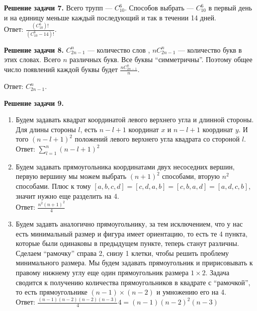 \documentclass[a4paper,12pt]{article}
\newenvironment{problem}[1]{\par\bigskip\noindent\textbf{Решение задачи #1.}
  \enskip\ignorespaces}{}
\begin{document}
  \begin{problem}{7}
    Всего трупп --- $C_{10}^6$. Способов выбрать --- $C_{10}^6$ в первый день
    и на единицу меньше каждый последующий и так в течении 14 дней. \\

    Ответ: $\frac{(C_{10}^6)!}{(C_{10}^6 - 14)!}$.
  \end{problem}

  \begin{problem}{8}
    $C_{2n-1}^n$ --- количество слов , $n C_{2n-1}^n$ --- количество букв
    в этих словах. Всего $n$ различных букв. Все буквы ``симметричны''.
    Поэтому общее число появлений каждой буквы будет
    $\frac{n C_{2n-1}^n}{n}$.

    Ответ: $C_{2n-1}^n$.
  \end{problem}

  \begin{problem}{9}
    \begin{enumerate}
      \item Будем задавать квадрат координатой левого верхнего угла и длинной
        стороны. Для длины стороны $l$, есть $n-l+1$ координат $x$ и $n-l+1$
        координат $y$. И того $(n-l+1)^2$ положений левого верхнего угла
        квадрата со стороной $l$. \\

        Ответ: $\sum\limits_{l = 1}^{n} (n-l+1)^2$
      \item Будем задавать прямоугольника координатами двух несоседних вершин,
        первую вершину мы можем выбрать $(n+1)^2$ способами, вторую $n^2$
        способами. Плюс к тому $[a,b,c,d] = [c,d,a,b] = [c,b,a,d] = [a,d,c,b]$,
        значит нужно еще разделить на 4. \\

        Ответ: $\frac{n^2(n+1)^2}{4}$

      \item Будем задавть аналогично прямоугольнику, за тем исключением, что
        у нас есть минимальный размер и фигура имеет ориентацию, то есть те
        4 пункта, которые были одинаковы в предыдущем пункте, теперь станут
        различны. Сделаем ``рамочку'' справа 2, снизу 1 клетки, чтобы решить
        проблему минимального размера. Мы будем задавать прямоугольник и
        пририсовывать к правому нижнему углу еще один прямоугольник размера
        $1\times2$. Задача сводится к получению количества прямоугольников в
        квадрате с ``рамочкой'', то есть прямоугольнике $(n-1)\times (n-2)$
        и умножению его на 4. \\

        Ответ: $\frac{(n-1)(n-2)(n-2)(n-3)}{4}4 = (n-1)(n-2)^2(n-3)$
    \end{enumerate}
  \end{problem}
\end{document}
